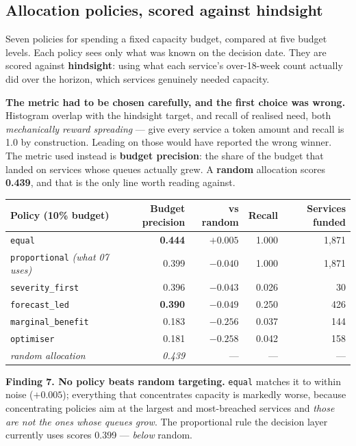 \documentclass[11pt,a4paper]{article}
\newcommand{\keypoint}[1]{%
  \par\vspace{0.4em}%
  \noindent\colorbox{fed!8}{\parbox{0.98\textwidth}{\vspace{0.2em}#1\vspace{0.2em}}}%
  \par\vspace{0.4em}}
\begin{document}
\subsection{Allocation policies, scored against hindsight}

Seven policies for spending a fixed capacity budget, compared at five budget levels. Each policy sees
only what was known on the decision date. They are scored against \textbf{hindsight}: using what each
service's over-18-week count actually did over the horizon, which services genuinely needed capacity.

\keypoint{\textbf{The metric had to be chosen carefully, and the first choice was wrong.} Histogram
overlap with the hindsight target, and recall of realised need, both \emph{mechanically reward
spreading} --- give every service a token amount and recall is 1.0 by construction. Leading on those
would have reported the wrong winner. The metric used instead is \textbf{budget precision}: the share
of the budget that landed on services whose queues actually grew. A \textbf{random} allocation scores
\textbf{0.439}, and that is the only line worth reading against.}

\begin{center}
\small
\begin{tabular}{@{}lrrrr@{}}
\toprule
\textbf{Policy (10\% budget)} & \textbf{Budget precision} & \textbf{vs random} & \textbf{Recall} & \textbf{Services funded} \\
\midrule
\texttt{equal} & \textbf{0.444} & $+0.005$ & 1.000 & 1{,}871 \\
\texttt{proportional} \emph{(what 07 uses)} & 0.399 & $-0.040$ & 1.000 & 1{,}871 \\
\texttt{severity\_first} & 0.396 & $-0.043$ & 0.026 & 30 \\
\texttt{forecast\_led} & \textbf{0.390} & $-0.049$ & 0.250 & 426 \\
\texttt{marginal\_benefit} & 0.183 & $-0.256$ & 0.037 & 144 \\
\texttt{optimiser} & 0.181 & $-0.258$ & 0.042 & 158 \\
\midrule
\emph{random allocation} & \emph{0.439} & --- & --- & --- \\
\bottomrule
\end{tabular}
\end{center}

\keypoint{\textbf{Finding 7. No policy beats random targeting.} \texttt{equal} matches it to within
noise ($+0.005$); everything that concentrates capacity is markedly worse, because concentrating
policies aim at the largest and most-breached services and \emph{those are not the ones whose queues
grow}. The proportional rule the decision layer currently uses scores 0.399 --- \emph{below} random.}
\end{document}

